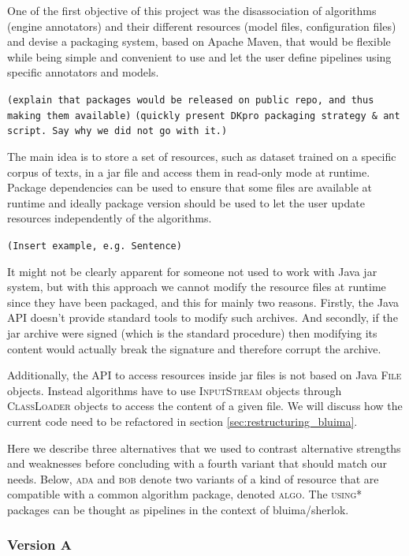 \documentclass{article}
\newcommand{\id}[1]{\mbox{\textsc{#1}}}
\newcommand{\TODO}[1]{\texttt{\textcolor{YellowOrange}{(#1)}}} %
\begin{document}
One of the first objective of this project was the disassociation of algorithms (engine annotators) and their different resources (model files, configuration files) and devise a packaging system, based on Apache Maven, that would be flexible while being simple and convenient to use and let the user define pipelines using specific annotators and models.

\TODO{explain that packages would be released on public repo, and thus making them available}
\TODO{quickly present DKpro packaging strategy \& ant script. Say why we did not go with it.}

The main idea is to store a set of resources, such as dataset trained on a specific corpus of texts, in a jar file and access them in read-only mode at runtime. Package dependencies can be used to ensure that some files are available at runtime and ideally package version should be used to let the user update resources independently of the algorithms.

\TODO{Insert example, e.g. Sentence}

It might not be clearly apparent for someone not used to work with Java jar system, but with this approach we cannot modify the resource files at runtime since they have been packaged, and this for mainly two reasons. Firstly, the Java API doesn't provide standard tools to modify such archives. And secondly, if the jar archive were signed (which is the standard procedure) then modifying its content would actually break the signature and therefore corrupt the archive.

Additionally, the API to access resources inside jar files is not based on Java \id{File} objects. Instead algorithms have to use \id{InputStream} objects through \id{ClassLoader} objects to access the content of a given file. We will discuss how the current code need to be refactored in section \ref{sec:restructuring_bluima}.

Here we describe three alternatives that we used to contrast alternative strengths and weaknesses before concluding with a fourth variant that should match our needs. Below, \id{ada} and \id{bob} denote two variants of a kind of resource that are compatible with a common algorithm package, denoted \id{algo}. The \id{using*} packages can be thought as pipelines in the context of bluima/sherlok.

\subsubsection{Version A}
\end{document}

